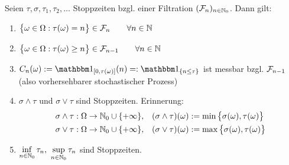 \setcounter{section}{3}
\begin{proposition}\label{prop3.1}
Seien $\tau,\sigma, \tau_1,\tau_2,\ldots$ Stoppzeiten bzgl. einer Filtration $(\mathcal{F}_n)_{n\in\mathbb{N}_0}$. Dann gilt:
\begin{enumerate}[label=(\alph*)]
\item $\begin{aligned}
\big\lbrace\omega\in\Omega:\tau(\omega)=n\big\rbrace\in\mathcal{F}_n\qquad\forall n\in\mathbb{N}
\end{aligned}$
\item $\begin{aligned}
\big\lbrace\omega\in\Omega:\tau(\omega)\geq n\big\rbrace\in\mathcal{F}_{n-1}\qquad\forall n\in\mathbb{N}
\end{aligned}$
\item $\begin{aligned}
C_n(\omega):=\indi_{[0,\tau(\omega)]}(n)=:\indi_{\lbrace n\leq\tau\rbrace}
\end{aligned}$ ist messbar bzgl. $\mathcal{F}_{n-1}$ (also vorhersehbarer stochastischer Prozess)
\item $\sigma\wedge\tau$ und $\sigma\vee\tau$ sind Stoppzeiten. Erinnerung:
\begin{align*}
&\sigma\wedge\tau:\Omega\to\mathbb{N}_0\cup\lbrace+\infty\rbrace,&(\sigma\wedge\tau)(\omega)&:=\min\big\lbrace\sigma(\omega),\tau(\omega)\big\rbrace\\
&\sigma\vee\tau:\Omega\to\mathbb{N}_0\cup\lbrace+\infty\rbrace,&(\sigma\vee\tau)(\omega)&:=\max\big\lbrace\sigma(\omega),\tau(\omega)\big\rbrace
\end{align*}
\item $\inf\limits_{n\in\mathbb{N}_0}\tau_n,~\sup\limits_{n\in\mathbb{N}_0}\tau_n$ sind Stoppzeiten.
\end{enumerate}
\end{proposition}
